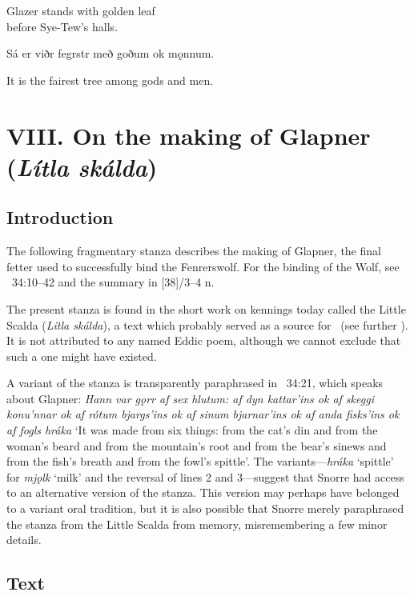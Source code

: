 \bvb Glazer stands with golden leaf \\
\ind before Sye-Tew’s  halls.\evb\evg

\bpg\bpa[0]\pva[4]%
Sá er viðr fegrstr með goðum ok mǫnnum.\epa

\bpb\pvb[4]%
It is the fairest tree among gods and men.\epb\epg

\sectionline

\newpage

\section{VIII. On the making of Glapner (\emph{Lítla skálda})}\chapterStart%
%

\subsection{Introduction}

The following fragmentary stanza describes the making of Glapner, the final fetter used to successfully bind the Fenrerswolf.  For the binding of the Wolf, see \Gylfaginning~34:10--42 and the summary in [38]/3--4 n.

The present stanza is found in the short work on kennings today called the Little Scalda (\emph{Lítla skálda}), a text which probably served as a source for \SnorraEdda\ (see further \cite[129--47]{Males2020}).  It is not attributed to any named Eddic poem, although we cannot exclude that such a one might have existed.

A variant of the stanza is transparently paraphrased in \Gylfaginning~34:21, which speaks about Glapner: \emph{Hann var gǫrr af sex hlutum: af dyn kattar’ins ok af skeggi konu’nnar ok af rótum bjargs’ins ok af sinum bjarnar’ins ok af anda fisks’ins ok af fogls hráka} ‘It was made from six things: from the cat’s din and from the woman’s beard and from the mountain’s root and from the bear’s sinews and from the fish’s breath and from the fowl’s spittle’.
The variants---\emph{hráka} ‘spittle’ for \emph{mjǫlk} ‘milk’ and the reversal of lines 2 and 3---suggest that Snorre had access to an alternative version of the stanza.
This version may perhaps have belonged to a variant oral tradition, but it is also possible that Snorre merely paraphrased the stanza from the Little Scalda from memory, misremembering a few minor details.

\subsection{Text}

